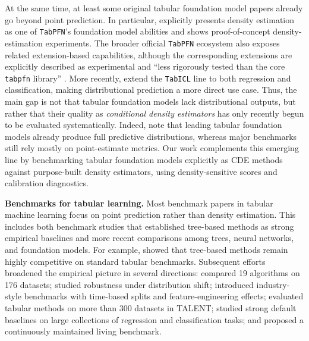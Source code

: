 \documentclass{article}
\newcommand{\method}[1]{\texttt{#1}}
\begin{document}
At the same time, at least some original tabular foundation model papers already
go beyond point prediction. In particular, \citet{hollmann2025tabpfn}
explicitly presents density estimation as one of \method{TabPFN}'s foundation
model abilities and shows proof-of-concept density-estimation experiments.
The broader official \method{TabPFN} ecosystem also exposes related extension-based
capabilities, although the corresponding extensions are explicitly described as
experimental and ``less rigorously tested than the core \texttt{tabpfn}
library'' \citep{priorlabs2025tabpfnextensions}.
More recently, \citet{qu2026tabiclv2} extend the \method{TabICL} line to both
regression and classification, making distributional prediction a more direct
use case. Thus, the main gap is not that tabular foundation models lack
distributional outputs, but rather that their quality as \emph{conditional
density estimators} has only recently begun to be evaluated systematically.
Indeed, \citet{landsgesell2026distributional} note that leading tabular
foundation models already produce full predictive distributions, whereas major
benchmarks still rely mostly on point-estimate metrics. Our work complements
this emerging line by benchmarking tabular foundation models explicitly as CDE
methods against purpose-built density estimators, using density-sensitive scores
and calibration diagnostics.

\textbf{Benchmarks for tabular learning.}
Most benchmark papers in tabular machine learning focus on point prediction rather than density estimation. This includes both benchmark studies that established tree-based methods as strong empirical baselines and more recent comparisons among trees, neural networks, and foundation models. For example, \citet{grinsztajn2022tree} showed that tree-based methods remain highly competitive on standard tabular benchmarks. Subsequent efforts broadened the empirical picture in several directions: \citet{mcelfresh2023tabzilla} compared 19 algorithms on 176 datasets; \citet{gardner2023tableshift} studied robustness under distribution shift; \citet{rubachev2025tabred} introduced industry-style benchmarks with time-based splits and feature-engineering effects; \citet{ye2024closerlook} evaluated tabular methods on more than 300 datasets in TALENT; \citet{holzmueller2024better} studied strong default baselines on large collections of regression and classification tasks; and \citet{erickson2025tabarena} proposed a continuously maintained living benchmark.
\end{document}
